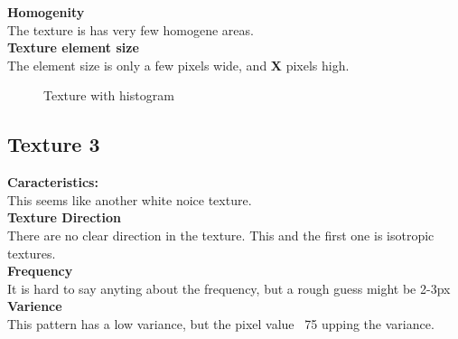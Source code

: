 \documentclass{article}
\begin{document}
\textbf{Homogenity}\\
The texture is has very few homogene areas.\\

\textbf{Texture element size}\\
The element size is only a few pixels wide, and \textbf{X} pixels high.


\begin{figure}[h]%
	\centering
    \qquad
    \caption{Texture with histogram}%
    \label{fig:IMG2}%
\end{figure}

\newpage

\subsection{Texture 3}
\textbf{Caracteristics:}\\
This seems like another white noice texture.\\

\textbf{Texture Direction}\\
There are no clear direction in the texture. This and the first one is isotropic textures.
\\ 
 
\textbf{Frequency} \\
It is hard to say anyting about the frequency, but a rough guess might be 2-3px\\ 


\textbf{Varience}\\
This pattern has a low variance, but the pixel value ~75 upping the variance.
\\
\end{document}

